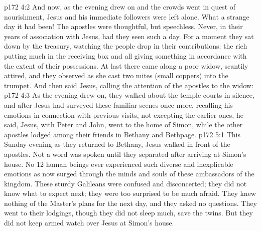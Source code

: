 \vs p172 4:2 And now, as the evening drew on and the crowds went in quest of nourishment, Jesus and his immediate followers were left alone. What a strange day it had been! The apostles were thoughtful, but speechless. Never, in their years of association with Jesus, had they seen such a day. For a moment they sat down by the treasury, watching the people drop in their contributions: the rich putting much in the receiving box and all giving something in accordance with the extent of their possessions. At last there came along a poor widow, scantily attired, and they observed as she cast two mites (small coppers) into the trumpet. And then said Jesus, calling the attention of the apostles to the widow: 
\vs p172 4:3 As the evening drew on, they walked about the temple courts in silence, and after Jesus had surveyed these familiar scenes once more, recalling his emotions in connection with previous visits, not excepting the earlier ones, he said,  Jesus, with Peter and John, went to the home of Simon, while the other apostles lodged among their friends in Bethany and Bethpage.
\vs p172 5:1 This Sunday evening as they returned to Bethany, Jesus walked in front of the apostles. Not a word was spoken until they separated after arriving at Simon’s house. No 12 human beings ever experienced such diverse and inexplicable emotions as now surged through the minds and souls of these ambassadors of the kingdom. These sturdy Galileans were confused and disconcerted; they did not know what to expect next; they were too surprised to be much afraid. They knew nothing of the Master’s plans for the next day, and they asked no questions. They went to their lodgings, though they did not sleep much, save the twins. But they did not keep armed watch over Jesus at Simon’s house.
